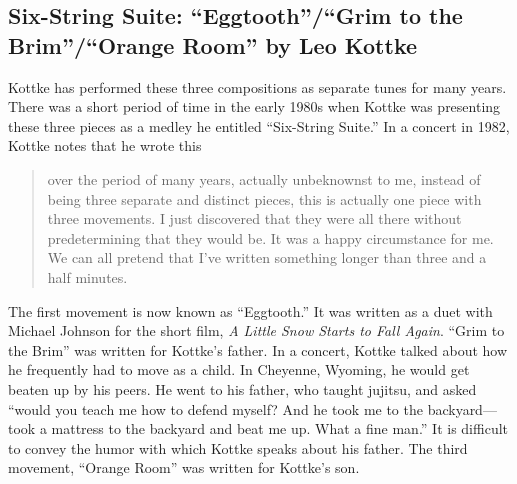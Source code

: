 \documentclass{tufte-handout}
\begin{document}
\subsection*{Six-String Suite: ``Eggtooth''/``Grim to the Brim''/``Orange
  Room'' by Leo Kottke}
Kottke has performed these three compositions as separate tunes for many
years. There was a short period of time in the early 1980s when Kottke was
presenting these three pieces as a medley he entitled ``Six-String Suite.''
In a concert in 1982, Kottke notes that he wrote this
\begin{quote}
  over the period of many years, actually unbeknownst to me, instead of being
  three separate and distinct pieces, this is actually one piece with three
  movements. I just discovered that they were all there without predetermining
  that they would be. It was a happy circumstance for me. We can all pretend
  that I've written something longer than three and a half minutes.
\end{quote}
The first movement is now known as ``Eggtooth.'' It was written as a duet with
Michael Johnson for the short film, \emph{A Little Snow Starts to Fall
  Again}. ``Grim to the Brim'' was written for Kottke's father. In a concert,
Kottke talked about how he frequently had to move as a child. In Cheyenne,
Wyoming, he would get beaten up by his peers. He went to his father, who
taught jujitsu, and asked ``would you teach me how to defend myself? And he
took me to the backyard—took a mattress to the backyard and beat me up. What a
fine man.'' It is difficult to convey the humor with which Kottke speaks about
his father. The third movement, ``Orange Room'' was written for Kottke's
son.

\end{document}

